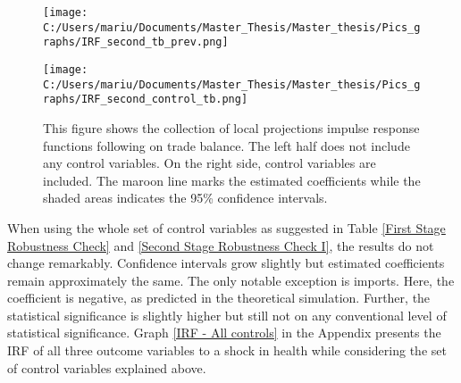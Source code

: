 \documentclass{article}
\begin{document}
\begin{figure}[!ht]{}
\begin{center}
\begin{minipage}[t]{0.9\textwidth}
\begin{minipage}[c]{0.5\linewidth}\vspace{0pt} 
\texttt{[image: C:/Users/mariu/Documents/Master\_Thesis/Master\_thesis/Pics\_graphs/IRF\_second\_tb\_prev.png]}\\
\end{minipage}\hfill%
\begin{minipage}[c]{0.5\linewidth}\vspace{0pt} 
\texttt{[image: C:/Users/mariu/Documents/Master\_Thesis/Master\_thesis/Pics\_graphs/IRF\_second\_control\_tb.png]}\\
\end{minipage}\hfill%
\caption{This figure shows the collection of local projections impulse response functions following \cite{jorda2005estimation} on trade balance. The left half does not include any control variables. On the right side, control variables are included. The maroon line marks the estimated coefficients while the shaded areas indicates the 95\% confidence intervals.}
\label{IRF - Trade Balance}
\end{minipage}
\end{center}
\end{figure}
When using the whole set of control variables as suggested in Table \ref{First Stage Robustness Check} and \ref{Second Stage Robustness Check I}, the results do not change remarkably. Confidence intervals grow slightly but estimated coefficients remain approximately the same. The only notable exception is imports. Here, the coefficient is negative, as predicted in the theoretical simulation. Further, the statistical significance is slightly higher but still not on any conventional level of statistical significance. Graph \ref{IRF - All controls} in the Appendix presents the IRF of all three outcome variables to a shock in health while considering the set of control variables explained above.

\pagebreak
\end{document}
